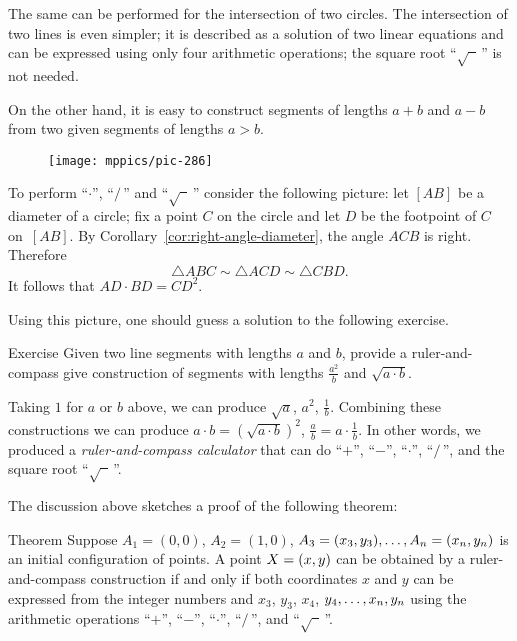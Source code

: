 The same can be performed for the intersection of two circles. 
The intersection of two lines is even simpler; 
it is described as a solution of two linear equations and can be expressed using only four arithmetic operations;
the square root ``$\sqrt{\phantom{a}}\,$'' is not needed.

\medskip

On the other hand, it is easy to construct segments of lengths $a+b$ and $a-b$ from two given segments of lengths $a>b$.

\begin{wrapfigure}{r}{37mm}
\vskip-4mm
\centering
\texttt{[image: mppics/pic-286]}
\end{wrapfigure}

To perform ``$\cdot$'', ``$/\,$''
and ``$\sqrt{\phantom{a}}\,$'' consider the following picture:
let $[AB]$ be a diameter of a circle; 
fix a point $C$ on the circle and let $D$ be the footpoint of $C$ on~$[AB]$.
By Corollary~\ref{cor:right-angle-diameter}, the angle $ACB$ is right.
Therefore 
$$\triangle ABC\sim\triangle ACD\sim \triangle CBD.$$
It follows that $AD\cdot BD=CD^2$. 

Using this picture, one should guess a solution to the following exercise.

\begin{thm}{Exercise}\label{ex:a2/b}
Given two line segments with lengths $a$ and $b$, provide a ruler-and-compass give construction of segments with lengths $\tfrac {a^2}b$ and $\sqrt{a\cdot b}$.
\end{thm}


Taking $1$ for $a$ or $b$ above, we can produce 
$\sqrt a$, $a^2$, $\tfrac1b$.
Combining these constructions we can produce
$a\cdot b=(\sqrt{a\cdot b})^2$,
$\tfrac ab=a\cdot\tfrac 1b$.
In other words, we produced a \emph{ruler-and-compass calculator} that can do ``$+$'', ``$-$'', ``$\cdot$'', ``$/\,$'', and the square root ``$\sqrt{\phantom{a}}\,$''.

The discussion above sketches a proof of the following theorem:
 
\begin{thm}{Theorem}\label{thm:constructible-numbers}
Suppose $A_1=(0,0)$, $A_2=(1,0)$, $A_3=(x_3,y_3),\dots,A_n=(x_n,y_n)$ is 
an initial configuration of points.
A point $X=(x,y)$ can be obtained by a ruler-and-compass construction
if and only if both coordinates $x$ and $y$ can be expressed from the integer numbers and $x_3$, $y_3$, $x_4$, $y_4,\dots,x_n,y_n$ using the arithmetic operations ``$+$'', ``$-$'', ``$\cdot$'', ``$/\,$'', and ``$\sqrt{\phantom{a}}\,$''.
\end{thm}

